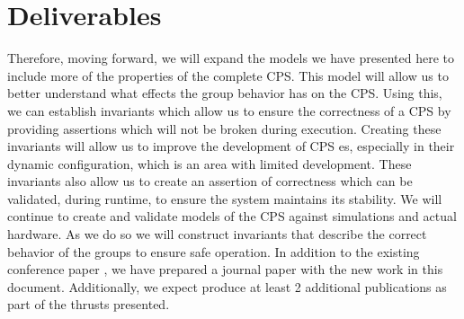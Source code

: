 \section{Deliverables}

Therefore, moving forward, we will expand the models we have presented here to include more of the properties of the complete CPS. This model will allow us to better understand what effects the group behavior has on the CPS. Using this, we can establish invariants which allow us to ensure the correctness of a CPS by providing assertions which will not be broken during execution. Creating these invariants will allow us to improve the development of CPS es, especially in their dynamic configuration, which is an area with limited development. These invariants also allow us to create an assertion of correctness which can be validated, during runtime, to ensure the system maintains its stability. We will continue to create and validate models of the CPS against simulations and actual hardware. As we do so we will construct invariants that describe the correct behavior of the groups to ensure safe operation. In addition to the existing conference paper \cite{CRITIS2012}, we have prepared a journal paper with the new work in this document. Additionally, we expect produce at least 2 additional publications as part of the thrusts presented. 
